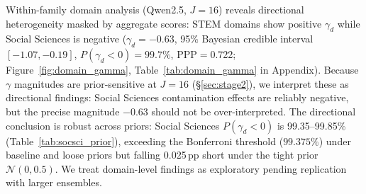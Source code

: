 Within-family domain analysis (Qwen2.5, $J=16$) reveals directional heterogeneity masked by aggregate scores: STEM domains show positive $\gamma_d$ while Social Sciences is negative ($\gamma_d = -0.63$, 95\% Bayesian credible interval $[-1.07, -0.19]$, $P(\gamma_d\!<\!0) = 99.7\%$, PPP$=$0.722; Figure~\ref{fig:domain_gamma}, Table~\ref{tab:domain_gamma} in Appendix). Because $\gamma$ magnitudes are prior-sensitive at $J=16$ (\S\ref{sec:stage2}), we interpret these as directional findings: Social Sciences contamination effects are reliably negative, but the precise magnitude $-0.63$ should not be over-interpreted. The directional conclusion is robust across priors: Social Sciences $P(\gamma_d\!<\!0)$ is 99.35--99.85\% (Table~\ref{tab:socsci_prior}), exceeding the Bonferroni threshold ($99.375\%$) under baseline and loose priors but falling 0.025\,pp short under the tight prior $\mathcal{N}(0, 0.5)$. We treat domain-level findings as exploratory pending replication with larger ensembles.
